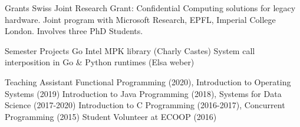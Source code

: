 


\begin{cvskills}

\cvskill
{Grants}
{Swiss Joint Research Grant: Confidential Computing solutions for legacy hardware.\linebreak
  Joint program with Microsoft Research, EPFL, Imperial College London.\linebreak
  Involves three PhD Students.\linebreak
}

\cvskill
{Semester Projects}
{
  Go Intel MPK library (Charly Castes)\linebreak
  System call interposition in Go \& Python runtimes (Elsa weber)\linebreak
}

\cvskill
{Teaching Assistant} %
{
  Functional Programming (2020), Introduction to Operating Systems (2019)\linebreak
  Introduction to Java Programming (2018), Systems for Data Science (2017-2020)\linebreak
  Introduction to C Programming (2016-2017), Concurrent Programming (2015)\linebreak
	Student Volunteer at ECOOP (2016)
}

\end{cvskills}
